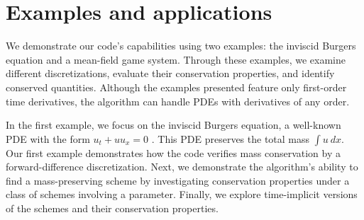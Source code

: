 \documentclass[runningheads]{llncs}
\newcommand{\1}{\chi}
\begin{document}
\section{Examples and applications}
\label{eaa}
We demonstrate our code's capabilities using two examples: the inviscid Burgers equation and a mean-field game system. 
Through these examples, we examine different discretizations, evaluate their conservation properties, and identify conserved quantities.
Although the examples presented feature only first-order time derivatives, the algorithm can handle PDEs with derivatives of any order.

In the first example, we focus on the inviscid Burgers equation, a well-known PDE with the form $u_t + uu_x = 0$ \cite{smoller94}. 
This PDE preserves the total mass $\int u\ dx$.
Our first example demonstrates how the code verifies mass conservation by a forward-difference discretization.
Next, we demonstrate the algorithm's ability to find a mass-preserving scheme by investigating conservation properties under a class of schemes involving a parameter.
Finally, we explore time-implicit versions of the schemes and their conservation properties.
\end{document}
